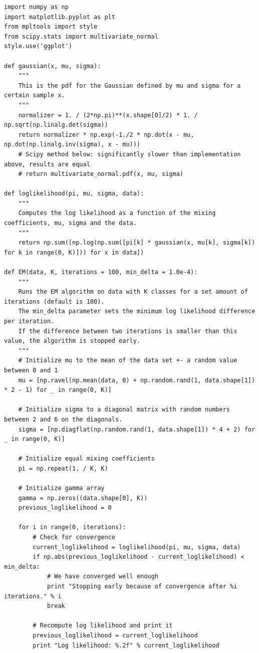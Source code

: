 \documentclass[paper=a4, fontsize=10pt]{scrartcl} %
\numberwithin{equation}{section} %
\numberwithin{figure}{section} %
\numberwithin{table}{section} %
\begin{document}
\begin{verbatim}
import numpy as np
import matplotlib.pyplot as plt
from mpltools import style
from scipy.stats import multivariate_normal
style.use('ggplot')

def gaussian(x, mu, sigma):
	"""
	This is the pdf for the Gaussian defined by mu and sigma for a certain sample x.
	"""
	normalizer = 1. / (2*np.pi)**(x.shape[0]/2) * 1. / np.sqrt(np.linalg.det(sigma))
	return normalizer * np.exp(-1./2 * np.dot(x - mu, np.dot(np.linalg.inv(sigma), x - mu)))
	# Scipy method below: significantly slower than implementation above, results are equal
	# return multivariate_normal.pdf(x, mu, sigma)

def loglikelihood(pi, mu, sigma, data):
	"""
	Computes the log likelihood as a function of the mixing coefficients, mu, sigma and the data.
	"""
	return np.sum([np.log(np.sum([pi[k] * gaussian(x, mu[k], sigma[k]) for k in range(0, K)])) for x in data])

def EM(data, K, iterations = 100, min_delta = 1.0e-4):
	"""
	Runs the EM algorithm on data with K classes for a set amount of iterations (default is 100).
	The min_delta parameter sets the minimum log likelihood difference per iteration.
	If the difference between two iterations is smaller than this value, the algorithm is stopped early.
	"""
	# Initialize mu to the mean of the data set +- a random value between 0 and 1
	mu = [np.ravel(np.mean(data, 0) + np.random.rand(1, data.shape[1]) * 2 - 1) for _ in range(0, K)]

	# Initialize sigma to a diagonal matrix with random numbers between 2 and 6 on the diagonals.
	sigma = [np.diagflat(np.random.rand(1, data.shape[1]) * 4 + 2) for _ in range(0, K)]

	# Initialize equal mixing coefficients
	pi = np.repeat(1. / K, K)

	# Initialize gamma array
	gamma = np.zeros((data.shape[0], K))
	previous_loglikelihood = 0

	for i in range(0, iterations):
		# Check for convergence
		current_loglikelihood = loglikelihood(pi, mu, sigma, data)
		if np.abs(previous_loglikelihood - current_loglikelihood) < min_delta:
			# We have converged well enough
			print "Stopping early because of convergence after %i iterations." % i
			break

		# Recompute log likelihood and print it
		previous_loglikelihood = current_loglikelihood
		print "Log likelihood: %.2f" % current_loglikelihood


\end{verbatim}
\end{document}
